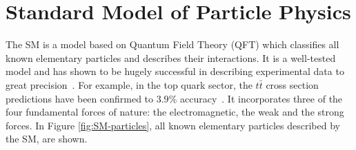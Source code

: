 \section{Standard Model of Particle Physics}
The SM is a model based on Quantum Field Theory (QFT) which classifies all known elementary particles and describes their interactions. It is a well-tested model and has shown to be hugely successful in describing experimental data to great precision~\cite{altarelli2014higgs, ALTARELLI_1998}. For example, in the top quark sector, the $t\bar{t}$ cross section predictions have been confirmed to $3.9\%$ accuracy~\cite{cms-ttbar, ATLAS-CONF-2019-041}. It incorporates three of the four fundamental forces of nature: the electromagnetic, the weak and the strong forces. In Figure \ref{fig:SM-particles}, all known elementary particles described by the SM, are shown.


